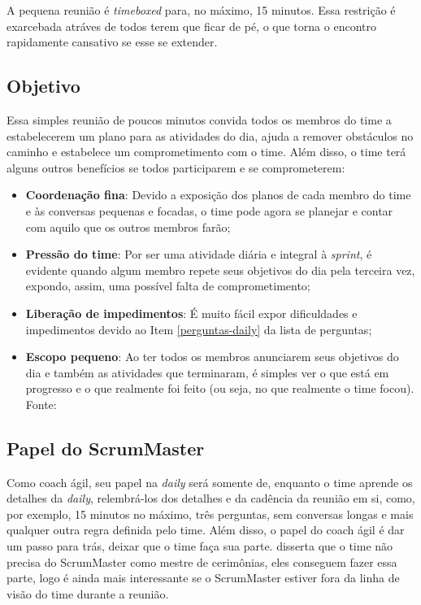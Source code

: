 \documentclass{iiufrgs}
\newcommand{\fonte}[1]{\\Fonte: {#1}}
\begin{document}
A pequena reunião é \textit{timeboxed} para, no máximo, 15 minutos. Essa restrição é exarcebada atráves de todos terem que ficar de pé, o que torna o encontro rapidamente cansativo se esse se extender.

\subsection{Objetivo}

Essa simples reunião de poucos minutos convida todos os membros do time a estabelecerem um plano para as atividades do dia, ajuda a remover obstáculos no caminho e estabelece um comprometimento com o time. Além disso, o time terá alguns outros benefícios se todos participarem e se comprometerem:

\begin{itemize}[leftmargin=3em, noitemsep, nosep, before=\vspace{1cm}, after=\vspace{1cm}]
    \setlength{\itemindent}{1em}
    \item \textbf{Coordenação fina}: Devido a exposição dos planos de cada membro do time e às conversas pequenas e focadas, o time pode agora se planejar e contar com aquilo que os outros membros farão;
    \item \textbf{Pressão do time}: Por ser uma atividade diária e integral à \textit{sprint}, é evidente quando algum membro repete seus objetivos do dia pela terceira vez, expondo, assim, uma possível falta de comprometimento;
    \item \textbf{Liberação de impedimentos}: É muito fácil expor dificuldades e impedimentos devido ao Item \ref{perguntas-daily} da lista de perguntas;
    \item \textbf{Escopo pequeno}: Ao ter todos os membros anunciarem seus objetivos do dia e também as atividades que terminaram, é simples ver o que está em progresso e o que realmente foi feito (ou seja, no que realmente o time focou).
    \fonte{\cite{Adkins2010Coaching}}
\end{itemize}

\subsection{Papel do ScrumMaster}

Como coach ágil, seu papel na \textit{daily} será somente de, enquanto o time aprende os detalhes da \textit{daily}, relembrá-los dos detalhes e da cadência da reunião em si, como, por exemplo, 15 minutos no máximo, três perguntas, sem conversas longas e mais qualquer outra regra definida pelo time. Além disso, o papel do coach ágil é dar um passo para trás, deixar que o time faça sua parte. \citeauthor{Adkins2010Coaching} disserta que o time não precisa do ScrumMaster como mestre de cerimônias, eles conseguem fazer essa parte, logo é ainda mais interessante se o ScrumMaster estiver fora da linha de visão do time durante a reunião.
\end{document}
